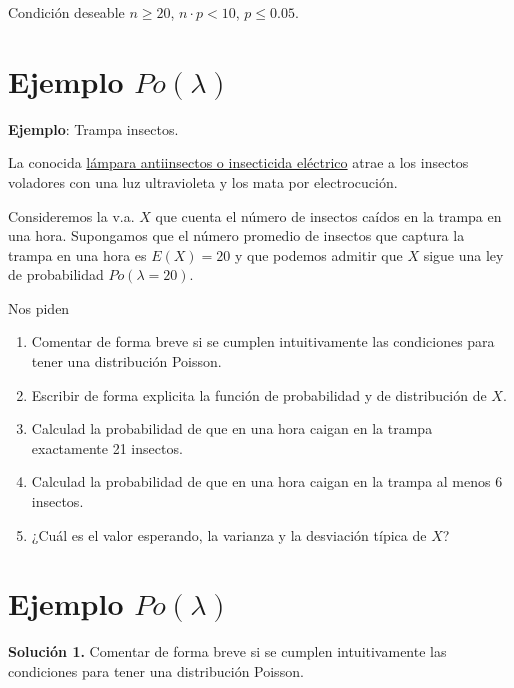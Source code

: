 \documentclass[
  letterpaper,
  DIV=11,
  numbers=noendperiod]{scrreprt}
\providecommand{\tightlist}{%
  \setlength{\itemsep}{0pt}\setlength{\parskip}{0pt}}\usepackage{longtable,booktabs,array}
\begin{document}
Condición deseable \(n\geq 20\), \(n\cdot p < 10\), \(p\leq 0.05\).

\section{\texorpdfstring{Ejemplo
\(Po(\lambda)\)}{Ejemplo Po(\textbackslash lambda)}}\label{ejemplo-polambda}

\textbf{Ejemplo}: Trampa insectos.

La conocida
\href{https://es.wikipedia.org/wiki/Insecticida_el\%C3\%A9ctrico}{lámpara
antiinsectos o insecticida eléctrico} atrae a los insectos voladores con
una luz ultravioleta y los mata por electrocución.

Consideremos la v.a. \(X\) que cuenta el número de insectos caídos en la
trampa en una hora. Supongamos que el número promedio de insectos que
captura la trampa en una hora es \(E(X)=20\) y que podemos admitir que
\(X\) sigue una ley de probabilidad \(Po(\lambda=20)\).

Nos piden

\begin{enumerate}
\def\labelenumi{\arabic{enumi}.}
\tightlist
\item
  Comentar de forma breve si se cumplen intuitivamente las condiciones
  para tener una distribución Poisson.
\item
  Escribir de forma explicita la función de probabilidad y de
  distribución de \(X\).
\item
  Calculad la probabilidad de que en una hora caigan en la trampa
  exactamente 21 insectos.
\item
  Calculad la probabilidad de que en una hora caigan en la trampa al
  menos 6 insectos.
\item
  ¿Cuál es el valor esperando, la varianza y la desviación típica de
  \(X\)?
\end{enumerate}

\section{\texorpdfstring{Ejemplo
\(Po(\lambda)\)}{Ejemplo Po(\textbackslash lambda)}}\label{ejemplo-polambda-1}

\textbf{Solución 1.} Comentar de forma breve si se cumplen
intuitivamente las condiciones para tener una distribución Poisson.
\end{document}
